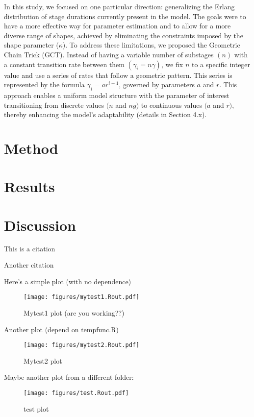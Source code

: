 \documentclass[12pt]{article}
\begin{document}
In this study, we focused on one particular direction: generalizing the Erlang distribution of stage durations currently present in the model. The goals were to have a more effective way for parameter estimation and to allow for a more diverse range of shapes, achieved by eliminating the constraints imposed by the shape parameter ($\kappa$). To address these limitations, we proposed the Geometric Chain Trick (GCT). Instead of having a variable number of substages $(n)$ with a constant transition rate between them $(\gamma_i = n\gamma)$, we fix $n$ to a specific integer value and use a series of rates that follow a geometric pattern. This series is represented by the formula $\gamma_i = ar^{i-1}$, governed by parameters $a$ and $r$. This approach enables a uniform model structure with the parameter of interest transitioning from discrete values $(n$ and $ng)$ to continuous values $(a$ and $r)$, thereby enhancing the model's adaptability (details in Section 4.x).
 



\section{Method}

\section*{Results}

\section{Discussion}




This is a citation \cite{Feng2016}

Another citation \cite{Anderson1991} 

Here's a simple plot (with no dependence)

\begin{figure}[h!]
    \centering
    \texttt{[image: figures/mytest1.Rout.pdf]}
    \caption{Mytest1 plot (are you working??)}
\end{figure}


Another plot (depend on tempfunc.R)

\begin{figure}[h]
    \centering
    \texttt{[image: figures/mytest2.Rout.pdf]}
    \caption{Mytest2 plot}
\end{figure}

Maybe another plot from a different folder:

\begin{figure}[h]
    \centering
    \texttt{[image: figures/test.Rout.pdf]}
    \caption{test plot}
\end{figure}






 
\end{document}
